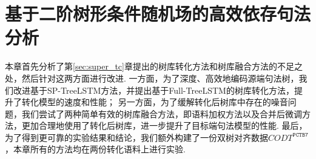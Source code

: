 
\chapter{基于二阶树形条件随机场的高效依存句法分析}
本章首先分析了第\ref{sec:super_tc}章提出的树库转化方法和树库融合方法的不足之处，然后针对这两方面进行改进.
一方面，为了深度、高效地编码源端句法树，我们改进基于SP-TreeLSTM方法，并提出基于Full-TreeLSTM的树库转化方法，提升了转化模型的速度和性能；
另一方面，为了缓解转化后树库中存在的噪音问题，我们尝试了两种简单有效的树库融合方法，即语料加权方法以及合并后微调方法，更加合理地使用了转化后树库，进一步提升了目标端句法模型的性能.
最后，为了得到更可靠的实验结果和结论，我们额外构建了一份双树对齐数据$CODT^{\texttt{PCTB7}}$，本章所有的方法均在两份转化语料上进行实验.

